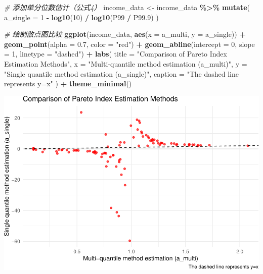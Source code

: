 \documentclass[
]{article}
\newenvironment{Shaded}{\begin{snugshade}}{\end{snugshade}}
\newcommand{\AttributeTok}[1]{\textcolor[rgb]{0.13,0.29,0.53}{#1}}
\newcommand{\CommentTok}[1]{\textcolor[rgb]{0.56,0.35,0.01}{\textit{#1}}}
\newcommand{\DecValTok}[1]{\textcolor[rgb]{0.00,0.00,0.81}{#1}}
\newcommand{\FloatTok}[1]{\textcolor[rgb]{0.00,0.00,0.81}{#1}}
\newcommand{\FunctionTok}[1]{\textcolor[rgb]{0.13,0.29,0.53}{\textbf{#1}}}
\newcommand{\NormalTok}[1]{#1}
\newcommand{\OtherTok}[1]{\textcolor[rgb]{0.56,0.35,0.01}{#1}}
\newcommand{\SpecialCharTok}[1]{\textcolor[rgb]{0.81,0.36,0.00}{\textbf{#1}}}
\newcommand{\StringTok}[1]{\textcolor[rgb]{0.31,0.60,0.02}{#1}}
\begin{document}
\begin{Shaded}
\begin{Highlighting}[]
\CommentTok{\# 添加单分位数估计（公式4）}
\NormalTok{income\_data }\OtherTok{\textless{}{-}}\NormalTok{ income\_data }\SpecialCharTok{\%\textgreater{}\%}
  \FunctionTok{mutate}\NormalTok{(}
    \AttributeTok{a\_single =} \DecValTok{1} \SpecialCharTok{{-}} \FunctionTok{log10}\NormalTok{(}\DecValTok{10}\NormalTok{) }\SpecialCharTok{/} \FunctionTok{log10}\NormalTok{(P99 }\SpecialCharTok{/}\NormalTok{ P99}\FloatTok{.9}\NormalTok{)}
\NormalTok{  )}

\CommentTok{\# 绘制散点图比较}
\FunctionTok{ggplot}\NormalTok{(income\_data, }\FunctionTok{aes}\NormalTok{(}\AttributeTok{x =}\NormalTok{ a\_multi, }\AttributeTok{y =}\NormalTok{ a\_single)) }\SpecialCharTok{+}
  \FunctionTok{geom\_point}\NormalTok{(}\AttributeTok{alpha =} \FloatTok{0.7}\NormalTok{, }\AttributeTok{color =} \StringTok{"red"}\NormalTok{) }\SpecialCharTok{+}
  \FunctionTok{geom\_abline}\NormalTok{(}\AttributeTok{intercept =} \DecValTok{0}\NormalTok{, }\AttributeTok{slope =} \DecValTok{1}\NormalTok{, }\AttributeTok{linetype =} \StringTok{"dashed"}\NormalTok{) }\SpecialCharTok{+}
  \FunctionTok{labs}\NormalTok{(}
    \AttributeTok{title =} \StringTok{"Comparison of Pareto Index Estimation Methods"}\NormalTok{,}
    \AttributeTok{x =} \StringTok{"Multi{-}quantile method estimation (a\_multi)"}\NormalTok{,}
    \AttributeTok{y =} \StringTok{"Single quantile method estimation (a\_single)"}\NormalTok{,}
    \AttributeTok{caption =} \StringTok{"The dashed line represents y=x"}
\NormalTok{  ) }\SpecialCharTok{+}
  \FunctionTok{theme\_minimal}\NormalTok{()}
\end{Highlighting}
\end{Shaded}

\includegraphics{Homework-05_files/figure-latex/unnamed-chunk-4-1.pdf}
\end{document}
